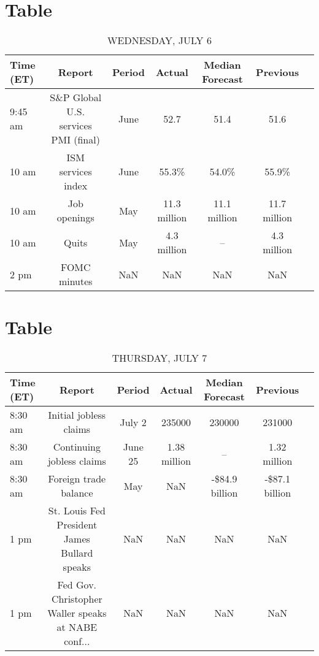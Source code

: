 \documentclass{article}%
\begin{document}
%
\section{Table}%
\label{sec:Table}%


\begin{table}[htbp]%
\caption{WEDNESDAY, JULY 6}%
\centering%
\begin{adjustbox}{width=1\textwidth}%
\begin{tabular}{lcccccc}
\toprule
Time (ET) &                               Report & Period &       Actual & Median Forecast &     Previous \\
\midrule
  9:45 am & S\&P Global U.S. services PMI (final) &   June &         52.7 &            51.4 &         51.6 \\
    10 am &                   ISM services index &   June &        55.3\% &           54.0\% &        55.9\% \\
    10 am &                         Job openings &    May & 11.3 million &    11.1 million & 11.7 million \\
    10 am &                                Quits &    May &  4.3 million &              -- &  4.3 million \\
     2 pm &                         FOMC minutes &    NaN &          NaN &             NaN &          NaN \\
\bottomrule
\end{tabular}
%
\end{adjustbox}%
\end{table}

%
\section{Table}%
\label{sec:Table}%


\begin{table}[htbp]%
\caption{THURSDAY, JULY 7}%
\centering%
\begin{adjustbox}{width=1\textwidth}%
\begin{tabular}{lcccccc}
\toprule
Time (ET) &                                             Report &  Period &       Actual & Median Forecast &       Previous \\
\midrule
  8:30 am &                             Initial jobless claims &  July 2 &       235000 &          230000 &         231000 \\
  8:30 am &                          Continuing jobless claims & June 25 & 1.38 million &              -- &   1.32 million \\
  8:30 am &                              Foreign trade balance &     May &          NaN &  -\$84.9 billion & -\$87.1 billion \\
     1 pm &       St. Louis Fed President James Bullard speaks &     NaN &          NaN &             NaN &            NaN \\
     1 pm & Fed Gov. Christopher Waller speaks at NABE conf... &     NaN &          NaN &             NaN &            NaN \\
\bottomrule
\end{tabular}
%
\end{adjustbox}%
\end{table}
\end{document}
